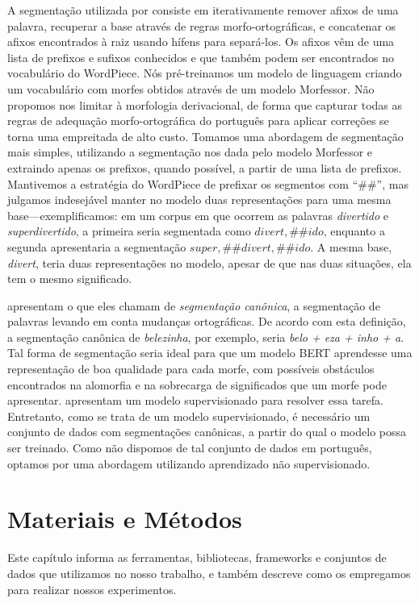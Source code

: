 \documentclass[cic,tc]{iiufrgs}
\begin{document}
 \begin{sloppypar}
 A segmentação utilizada por \citet{Hofmann2021SuperbizarreIN} consiste em iterativamente remover afixos de uma palavra, recuperar a base através de regras morfo-ortográficas, e concatenar os afixos encontrados à raiz usando hífens para separá-los. Os afixos vêm de uma lista de prefixos e sufixos conhecidos e que também podem ser encontrados no vocabulário do WordPiece. Nós pré-treinamos um modelo de linguagem criando um vocabulário com morfes obtidos através de um modelo Morfessor. Não propomos nos limitar à morfologia derivacional, de forma que capturar todas as regras de adequação morfo-ortográfica do português para aplicar correções se torna uma empreitada de alto custo. Tomamos uma abordagem de segmentação mais simples, utilizando a segmentação nos dada pelo modelo Morfessor e extraindo apenas os prefixos, quando possível, a partir de uma lista de prefixos. Mantivemos a estratégia do WordPiece de prefixar os segmentos com ``\#\#'', mas julgamos indesejável manter no modelo duas representações para uma mesma base---exemplificamos: em um corpus em que ocorrem as palavras \emph{divertido} e \emph{superdivertido}, a primeira seria segmentada como $divert, \text{\#}\text{\#}ido$, enquanto a segunda apresentaria a segmentação $super, \text{\#}\text{\#}divert, \text{\#}\text{\#}ido$. A mesma base, \emph{divert}, teria duas representações no modelo, apesar de que nas duas situações, ela tem o mesmo significado.
\end{sloppypar}

\citet{cotterell-etal-2016-morphological-segmentation} apresentam o que eles chamam de \emph{segmentação canônica}, a segmentação de palavras levando em conta mudanças ortográficas. De acordo com esta definição, a segmentação canônica de \emph{belezinha}, por exemplo, seria \emph{belo + eza + inho + a}. Tal forma de segmentação seria ideal para que um modelo BERT aprendesse uma representação de boa qualidade para cada morfe, com possíveis obstáculos encontrados na alomorfia  e na sobrecarga de significados que um morfe pode apresentar. \citet{cotterell-schutze-2018-joint} apresentam um modelo supervisionado para resolver essa tarefa. Entretanto, como se trata de um modelo supervisionado, é necessário um conjunto de dados com segmentações canônicas, a partir do qual o modelo possa ser treinado. Como não dispomos de tal conjunto de dados em português, optamos por uma abordagem utilizando aprendizado não supervisionado.

\chapter{Materiais e Métodos}
Este capítulo informa as ferramentas, bibliotecas, frameworks e conjuntos de dados que utilizamos no nosso trabalho, e também descreve como os empregamos para realizar nossos experimentos.
\end{document}
